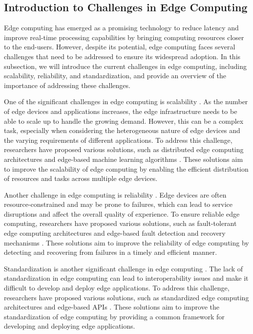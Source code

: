 \documentclass[11pt]{article}
\begin{document}
\subsection{Introduction to Challenges in Edge Computing}

Edge computing has emerged as a promising technology to reduce latency and improve real-time processing capabilities by bringing computing resources closer to the end-users. However, despite its potential, edge computing faces several challenges that need to be addressed to ensure its widespread adoption. In this subsection, we will introduce the current challenges in edge computing, including scalability, reliability, and standardization, and provide an overview of the importance of addressing these challenges.

One of the significant challenges in edge computing is scalability \cite{ref2}. As the number of edge devices and applications increases, the edge infrastructure needs to be able to scale up to handle the growing demand. However, this can be a complex task, especially when considering the heterogeneous nature of edge devices and the varying requirements of different applications. To address this challenge, researchers have proposed various solutions, such as distributed edge computing architectures \cite{ref200} and edge-based machine learning algorithms \cite{ref43}. These solutions aim to improve the scalability of edge computing by enabling the efficient distribution of resources and tasks across multiple edge devices.

Another challenge in edge computing is reliability \cite{ref18}. Edge devices are often resource-constrained and may be prone to failures, which can lead to service disruptions and affect the overall quality of experience. To ensure reliable edge computing, researchers have proposed various solutions, such as fault-tolerant edge computing architectures \cite{ref201} and edge-based fault detection and recovery mechanisms \cite{ref150}. These solutions aim to improve the reliability of edge computing by detecting and recovering from failures in a timely and efficient manner.

Standardization is another significant challenge in edge computing \cite{ref41}. The lack of standardization in edge computing can lead to interoperability issues and make it difficult to develop and deploy edge applications. To address this challenge, researchers have proposed various solutions, such as standardized edge computing architectures \cite{ref202} and edge-based APIs \cite{ref15}. These solutions aim to improve the standardization of edge computing by providing a common framework for developing and deploying edge applications.
\end{document}

